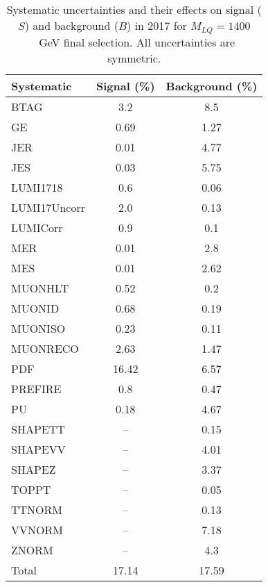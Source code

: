 \begin{table}[htbp]
\begin{center}
\caption{Systematic uncertainties and their effects on signal ($S$) and background ($B$) in 2017 for $M_{LQ}=1400$~GeV final selection. All uncertainties are symmetric.}
\begin{tabular}{lcc}
\hline\hline
Systematic & Signal (\%) & Background (\%) \\ \hline 
BTAG & 3.2 & 8.5\\ 
GE & 0.69 & 1.27\\ 
JER & 0.01 & 4.77\\ 
JES & 0.03 & 5.75\\ 
LUMI1718 & 0.6 & 0.06\\ 
LUMI17Uncorr & 2.0 & 0.13\\ 
LUMICorr & 0.9 & 0.1\\ 
MER & 0.01 & 2.8\\ 
MES & 0.01 & 2.62\\ 
MUONHLT & 0.52 & 0.2\\ 
MUONID & 0.68 & 0.19\\ 
MUONISO & 0.23 & 0.11\\ 
MUONRECO & 2.63 & 1.47\\ 
PDF & 16.42 & 6.57\\ 
PREFIRE & 0.8 & 0.47\\ 
PU & 0.18 & 4.67\\ 
SHAPETT & -- & 0.15\\ 
SHAPEVV & -- & 4.01\\ 
SHAPEZ & -- & 3.37\\ 
TOPPT & -- & 0.05\\ 
TTNORM & -- & 0.13\\ 
VVNORM & -- & 7.18\\ 
ZNORM & -- & 4.3\\ 
Total & 17.14 & 17.59\\ \hline \hline
\end{tabular}
\label{tab:SysUncertainties_uujj_1400}
\end{center}
\end{table}

